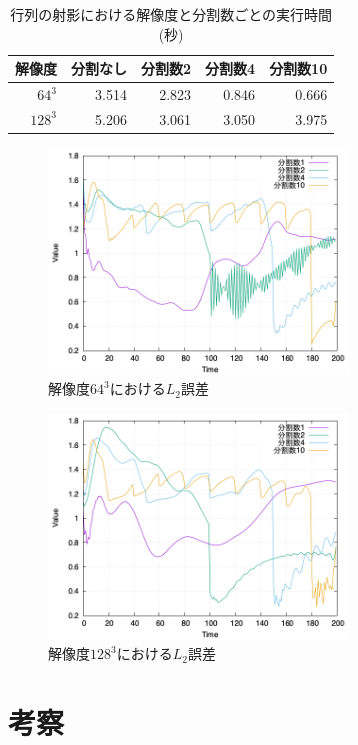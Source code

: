 \documentclass[uplatex,dvipdfmx,10pt,a4paper,notitlepage,oneside,twocolumn]{abst_jsarticle}
\begin{document}
\begin {table}[htbp]
    \centering
  \caption{行列の射影における解像度と分割数ごとの実行時間(秒)}
  \label{tab:projection}
  \begin {tabular}{rrrrr} \hline
    \multicolumn{1}{c}{解像度} 					&\multicolumn{1}{c}{分割なし} 		&\multicolumn{1}{c}{分割数2}			&\multicolumn{1}{c}{分割数4} 		&\multicolumn{1}{c}{分割数10}\\ \hline
    $64^3$ 					& 3.514 			&2.823	 		&0.846	 		&0.666\\
    $128^3$ 				& 5.206 			& 3.061 			& 3.050 		&3.975\\ \hline
  \end {tabular}
\end {table}

\begin{figure}[htbp]
\centering
\includegraphics[width=80mm]{images/64error.png}
\caption{$解像度64^3におけるL_2誤差$}
\label{fig:64error}
\end{figure}

\begin{figure}[htbp]
\centering
\includegraphics[width=80mm]{images/128error.png}
\caption{$解像度128^3におけるL_2誤差$}
\label{fig:128error}
\end{figure}

\section{考察}
\end{document}
